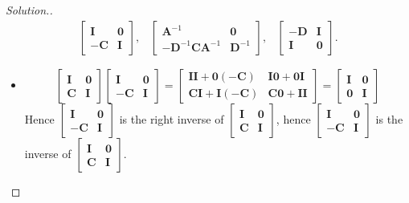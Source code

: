 \begin{enumerate}
\begin{proof}[Solution.]
\[\begin{array}{lll}
\begin{bmatrix}
\bm I&\bm 0\\-\bm C&\bm I
\end{bmatrix},
&
\begin{bmatrix}
\bm A^{-1}&\bm 0\\ -\bm D^{-1}\bm C\bm A^{-1}&\bm D^{-1}
\end{bmatrix},
&
\begin{bmatrix}
-\bm D&\bm I\\\bm I&\bm 0
\end{bmatrix}.
\end{array}
\]
\begin{itemize}
\item
\[
\begin{bmatrix}
\bm I&\bm 0\\\bm C&\bm I
\end{bmatrix}
\begin{bmatrix}
\bm I&\bm 0\\-\bm C&\bm I
\end{bmatrix} = \begin{bmatrix}
\bm I\bm I+\bm 0(-\bm C)&\bm I\bm 0+\bm 0\bm I\\
\bm C\bm I+\bm I(-\bm C)&\bm C\bm 0+\bm I\bm I
\end{bmatrix}= \begin{bmatrix}
\bm I&\bm 0\\\bm 0&\bm I
\end{bmatrix}
\]
Hence $\begin{bmatrix}
\bm I&\bm 0\\-\bm C&\bm I
\end{bmatrix}$ is the right inverse of $\begin{bmatrix}
\bm I&\bm 0\\\bm C&\bm I
\end{bmatrix}$, hence $\begin{bmatrix}
\bm I&\bm 0\\-\bm C&\bm I
\end{bmatrix}$ is the inverse of $\begin{bmatrix}
\bm I&\bm 0\\\bm C&\bm I
\end{bmatrix}$.



\end{itemize}
\end{proof}
\end{enumerate}
